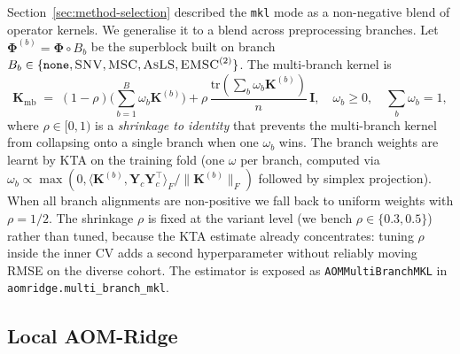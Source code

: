 \documentclass[11pt,a4paper]{article}
\newcommand{\identity}{\mathbf{I}}
\newcommand{\Yc}{\mathbf{Y}_{\!c}}
\newcommand{\Kmat}{\mathbf{K}}
\newcommand{\Phimat}{\mathbf{\Phi}}
\newcommand{\SNV}{\textsc{SNV}\xspace}
\newcommand{\MSC}{\textsc{MSC}\xspace}
\newcommand{\EMSC}{\textsc{EMSC}\xspace}
\newcommand{\AsLS}{\textsc{AsLS}\xspace}
\begin{document}
Section~\ref{sec:method-selection} described the \texttt{mkl} mode as
a non-negative blend of operator kernels. We generalise it to a blend
across preprocessing branches. Let
$\Phimat^{(b)}=\Phimat\!\circ B_b$ be the superblock built on branch
$B_b\in\{\texttt{none},\SNV,\MSC,\AsLS,\EMSC^{(2)}\}$. The
multi-branch kernel is
\begin{equation}
\Kmat_{\mathrm{mb}}\;=\;
(1-\rho)\Big(\sum_{b=1}^{B}\omega_b\Kmat^{(b)}\Big)
+ \rho\,\frac{\mathrm{tr}(\sum_b\omega_b\Kmat^{(b)})}{n}\,\identity,
\quad \omega_b\geq 0,\quad \sum_b\omega_b=1,
\label{eq:mb-mkl}
\end{equation}
where $\rho\in[0,1)$ is a \emph{shrinkage to identity} that prevents
the multi-branch kernel from collapsing onto a single branch when one
$\omega_b$ wins. The branch weights are learnt by KTA on the training
fold (one $\omega$ per branch, computed via
$\omega_b\propto\max(0,\langle\Kmat^{(b)},\Yc\Yc^\top\rangle_F/\|\Kmat^{(b)}\|_F)$
followed by simplex projection). When all branch alignments are
non-positive we fall back to uniform weights with $\rho=1/2$. The
shrinkage $\rho$ is fixed at the variant level (we bench
$\rho\in\{0.3,0.5\}$) rather than tuned, because the KTA estimate
already concentrates: tuning $\rho$ inside the inner CV adds a second
hyperparameter without reliably moving RMSE on the diverse cohort.
The estimator is exposed as \texttt{AOMMultiBranchMKL} in
\texttt{aomridge.multi\_branch\_mkl}.

\subsection{Local AOM-Ridge}\label{sec:method-local}
\end{document}
